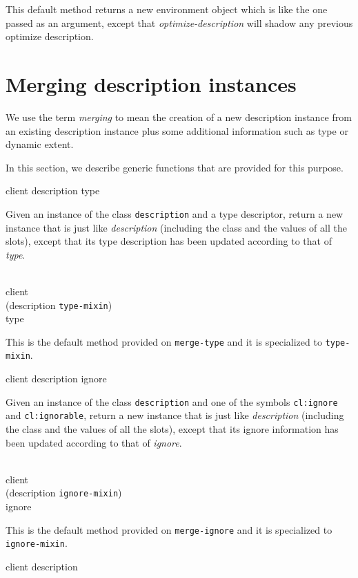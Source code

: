 This default method returns a new environment object which is like the
one passed as an argument, except that \textit{optimize-description}
will shadow any previous optimize description.

\section{Merging description instances}

We use the term \emph{merging} to mean the creation of a new
description instance from an existing description instance plus some
additional information such as type or dynamic extent.

In this section, we describe generic functions that are provided for
this purpose.

 {client description type}

Given an instance of the class \texttt{description} and a
type descriptor, return a new instance that is just like
\textit{description} (including the class and the values of
all the slots), except that its type description has been updated
according to that of \textit{type}.

\\
           {client\\
            (description {\tt type-mixin})\\
            type}

This is the default method provided on \texttt{merge-type}
and it is specialized to \texttt{type-mixin}.

 {client description ignore}

Given an instance of the class \texttt{description} and one
of the symbols \texttt{cl:ignore} and \texttt{cl:ignorable},
return a new instance that is just like
\textit{description} (including the class and the values of
all the slots), except that its ignore information has been updated
according to that of \textit{ignore}.

\\
           {client\\
            (description {\tt ignore-mixin})\\
            ignore}

This is the default method provided on \texttt{merge-ignore}
and it is specialized to \texttt{ignore-mixin}.

 {client description}

